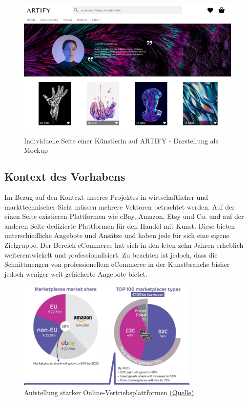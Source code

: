 \documentclass[11pt,a4paper]{report}
\begin{document}
\begin{figure}[htb]
    \includegraphics[width=1\textwidth]{artify-02.png}
    \caption{Individuelle Seite einer Künstlerin auf ARTIFY - Darstellung als Mockup}
    \label{3_2}
\end{figure}
\subsection{Kontext des Vorhabens}
Im Bezug auf den Kontext unseres Projektes in wirtschaftlicher und markttechnischer Sicht müssen mehrere Vektoren betrachtet werden. Auf der einen Seite existieren Plattformen wie eBay, Amazon, Etsy und Co. und auf der anderen Seite dedizierte Plattformen für den Handel mit Kunst. Diese bieten unterschiedliche Angebote und Ansätze und haben jede für sich eine eigene Zielgruppe. Der Bereich eCommerce hat sich in den leten zehn Jahren erheblich weiterentwickelt und professionalisiert. Zu beachten ist jedoch, dass die Schnittmengen von professionellem eCommerce in der Kunstbranche bisher jedoch weniger weit gefächerte Angebote bietet. \\

\begin{figure}[htb]
    \includegraphics[width=0.8\textwidth]{contesters.png}
    \caption{Aufstellung starker Online-Vertriebsplattformen \href{https://www.e-commerce-magazin.de/online-marktplaetze-umsatz-in-cross-border-handel-steigt-auf-ueber-115-milliarden-euro/}{ (Quelle)}}
    \label{3_2}
\end{figure}
\end{document}
